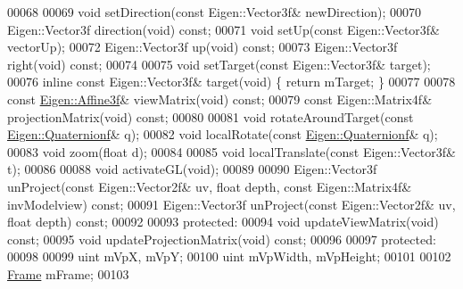 \begin{DoxyCode}
00068     
00069     \textcolor{keywordtype}{void} setDirection(\textcolor{keyword}{const} Eigen::Vector3f& newDirection);
00070     Eigen::Vector3f direction(\textcolor{keywordtype}{void}) \textcolor{keyword}{const};
00071     \textcolor{keywordtype}{void} setUp(\textcolor{keyword}{const} Eigen::Vector3f& vectorUp);
00072     Eigen::Vector3f up(\textcolor{keywordtype}{void}) \textcolor{keyword}{const};
00073     Eigen::Vector3f right(\textcolor{keywordtype}{void}) \textcolor{keyword}{const};
00074     
00075     \textcolor{keywordtype}{void} setTarget(\textcolor{keyword}{const} Eigen::Vector3f& target);
00076     \textcolor{keyword}{inline} \textcolor{keyword}{const} Eigen::Vector3f& target(\textcolor{keywordtype}{void}) \{ \textcolor{keywordflow}{return} mTarget; \}
00077     
00078     \textcolor{keyword}{const} \hyperlink{group___geometry___module_class_eigen_1_1_transform}{Eigen::Affine3f}& viewMatrix(\textcolor{keywordtype}{void}) \textcolor{keyword}{const};
00079     \textcolor{keyword}{const} Eigen::Matrix4f& projectionMatrix(\textcolor{keywordtype}{void}) \textcolor{keyword}{const};
00080     
00081     \textcolor{keywordtype}{void} rotateAroundTarget(\textcolor{keyword}{const} \hyperlink{group___geometry___module_class_eigen_1_1_quaternion}{Eigen::Quaternionf}& q);
00082     \textcolor{keywordtype}{void} localRotate(\textcolor{keyword}{const} \hyperlink{group___geometry___module_class_eigen_1_1_quaternion}{Eigen::Quaternionf}& q);
00083     \textcolor{keywordtype}{void} zoom(\textcolor{keywordtype}{float} d);
00084     
00085     \textcolor{keywordtype}{void} localTranslate(\textcolor{keyword}{const} Eigen::Vector3f& t);
00086     
00088     \textcolor{keywordtype}{void} activateGL(\textcolor{keywordtype}{void});
00089     
00090     Eigen::Vector3f unProject(\textcolor{keyword}{const} Eigen::Vector2f& uv, \textcolor{keywordtype}{float} depth, \textcolor{keyword}{const} Eigen::Matrix4f& invModelview) \textcolor{keyword}{
      const};
00091     Eigen::Vector3f unProject(\textcolor{keyword}{const} Eigen::Vector2f& uv, \textcolor{keywordtype}{float} depth) \textcolor{keyword}{const};
00092     
00093   \textcolor{keyword}{protected}:
00094     \textcolor{keywordtype}{void} updateViewMatrix(\textcolor{keywordtype}{void}) \textcolor{keyword}{const};
00095     \textcolor{keywordtype}{void} updateProjectionMatrix(\textcolor{keywordtype}{void}) \textcolor{keyword}{const};
00096 
00097   \textcolor{keyword}{protected}:
00098 
00099     uint mVpX, mVpY;
00100     uint mVpWidth, mVpHeight;
00101 
00102     \hyperlink{class_frame}{Frame} mFrame;
00103     

\end{DoxyCode}

